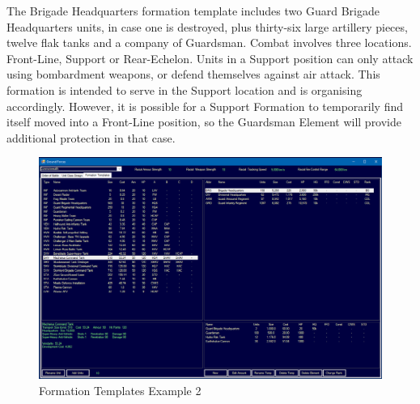 \documentclass[../../Aurora C# unofficial manual.tex]{subfiles}
\begin{document}
	The Brigade Headquarters formation template includes two Guard Brigade Headquarters units, in case one is destroyed, plus thirty-six large artillery pieces, twelve flak tanks and a company of Guardsman. Combat involves three locations. Front-Line, Support or Rear-Echelon. Units in a Support position can only attack using bombardment weapons, or defend themselves against air attack. This formation is intended to serve in the Support location and is organising accordingly. However, it is possible for a Support Formation to temporarily find itself moved into a Front-Line position, so the Guardsman Element will provide additional protection in that case.
	\begin{figure}[H]
		\centering
		\includegraphics[width=0.95\linewidth]{images/FormationTemplates2}
		\caption[Formation Templates]{Formation Templates Example 2}
		\label{fig:formationtemplates2}
	\end{figure}
\end{document}
